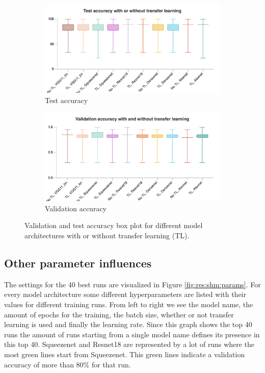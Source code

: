 \begin{figure}[hbtp]
	\begin{subfigure}{0.49\textwidth}
		\centering
		\includegraphics[width=\linewidth]{fig/results/wandb/second_handmade_sweep/charts/Section-13-Panel-1-nk6ghsz6f.png}
		\caption{Test accuracy}
		\label{fig:res:shm:tl:ta}
	\end{subfigure}
	\begin{subfigure}{0.49\textwidth}
		\centering
		\includegraphics[width=\linewidth]{fig/results/wandb/second_handmade_sweep/charts/Section-13-Panel-0-hqve9y31m.png}
		\caption{Validation accuracy}
		\label{fig:res:shm:tl:va}
	\end{subfigure}
	\caption{Validation and test accuracy box plot for different model architectures with or without transfer learning (TL).}
	\label{fig:res:shm:tl}
\end{figure}

\subsection{Other parameter influences}
The settings for the 40 best runs are visualized in Figure \ref{fig:res:shm:params}. For every model architecture some different hyperparameters are listed with their values for different training runs. From left to right we see the model name, the amount of epochs for the training, the batch size, whether or not transfer learning is used and finally the learning rate. Since this graph shows the top 40 runs the amount of runs starting from a single model name defines its presence in this top 40. Squeezenet and Resnet18 are represented by a lot of runs where the most green lines start from Squeezenet. This green lines indicate a validation accuracy of more than 80\% for that run.


